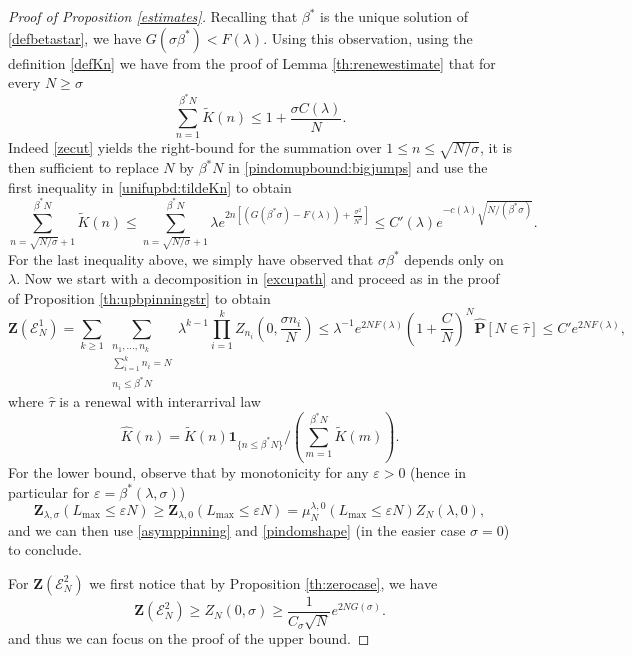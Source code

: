 \documentclass[reqno,11pt]{amsart}
\numberwithin{equation}{section}
\newcommand{\gb}{\beta}
\newcommand{\gep}{\varepsilon}       %
\newcommand{\gl}{\lambda}
\newcommand{\gs}{\sigma}
\newcommand{\cE}{{\ensuremath{\mathcal E}} }
\newcommand{\bP}{{\ensuremath{\mathbf P}} }
\newcommand{\bZ}{{\ensuremath{\mathbf Z}} }
\newcommand{\ind}{\mathbf{1}}
\renewcommand{\tilde}{\widetilde}
\renewcommand{\hat}{\widehat}
\newcommand{\sumthree}[3]{\sum_{\substack{#1 \\ #2 \\ #3}}} %
\begin{document}
\begin{proof}[Proof of Proposition \ref{estimates}]
 Recalling that $\beta^*$ is the unique solution of \eqref{defbetastar}, we have $G(\sigma \beta^*)<F(\gl)$.
 Using this observation, using the definition \eqref{defKn} we have from the proof of Lemma \ref{th:renewestimate} that for every $N\ge \sigma$
 \begin{equation}\label{cruxial}
  \sum_{n=1}^{\beta^* N} \tilde K(n)\le 1+\frac{ \sigma C(\gl)}{N}.
 \end{equation}
 Indeed \eqref{zecut} yields the right-bound  for the summation over $1 \le n \le \sqrt{N/\gs}$, 
 it is then sufficient to replace $N$ by $\beta^* N$ in 
 \eqref{pindomupbound:bigjumps} and use the first inequality in \eqref{unifupbd:tildeKn} to obtain 
 \begin{equation}
  \sum_{n= \sqrt{N/\sigma}+1}^{\beta^* N} \widetilde{K}(n)\le \sum_{n= \sqrt{N/\sigma}+1}^{\beta^* N}   \gl e^{2n\left[(G(\beta^* \sigma)- F(\gl))+ \frac{\sigma^2 }{N^2}\right]}\le C'(\gl)e^{-c(\gl)\sqrt{ N/(\gb^*\sigma)}}.
 \end{equation}
 For the last inequality above, we simply have observed that $\sigma \beta^*$ depends only on $\gl$.
 Now we start with a decomposition in  \eqref{excupath} and proceed as in the proof of Proposition \ref{th:upbpinningstr} to obtain 
\begin{equation}\label{partfunE1}
 \bZ(\cE^1_N)=\sum_{k\ge 1}\sumthree{n_1,\dots,n_k}{\sum_{i=1}^{k} n_i=N}{ n_i\le \beta^* N} \gl^{k-1} \prod_{i=1}^k Z_{n_i}\left(0,\frac{\sigma n_i}{N}\right) \le \gl^{-1} e^{2N F(\gl)} \left(1+\frac{C}{N}\right)^N \hat \bP[ N\in \hat \tau] \le C' e^{2N F(\gl)},
 \end{equation}
 where $\hat \tau$ is a renewal with interarrival law 
 \begin{equation}\label{onemorehat}
 \hat K(n)= \tilde K(n)\ind_{\{n\le \beta^*N\}}/ \left(\sum_{m=1}^{\beta^* N} \tilde K(m)\right).
 \end{equation}
 For the lower bound, observe that by monotonicity for any $\gep>0$ (hence in particular for $\gep=\beta^*(\gl,\sigma)$)
 $$\mathbf{Z}_{\gl,\sigma}(L_{\max}\le \gep N)\ge \mathbf{Z}_{\gl,0}(L_{\max}\le \gep N)=
 \mu^{\gl,0}_N(L_{\max}\le \gep N) Z_N(\gl,0),$$
 and we can then use \eqref{asymppinning} and \eqref{pindomshape} (in the easier case $\sigma=0$) to conclude.




\medskip

\noindent
 For  $\bZ(\cE^2_N)$
we first notice that
 by Proposition \ref{th:zerocase}, we have
\begin{equation}
\bZ(\cE_N^2) \ge Z_N(0,\gs) \ge \frac{1}{ C_{\gs}\sqrt{N}} e^{2N G(\gs)}.
\end{equation}
and thus we can focus on the proof of the upper bound.


\end{proof}
\end{document}
